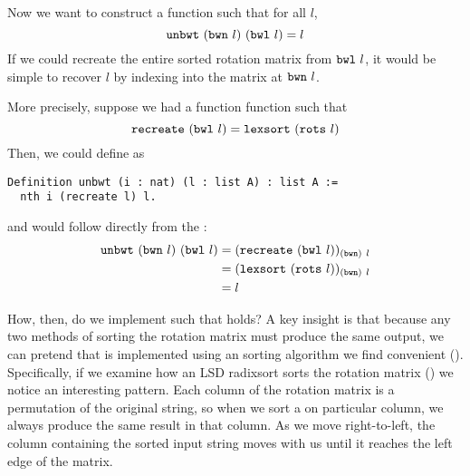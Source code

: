 \documentclass[sigplan,10pt,anonymous,review]{thesis}
\begin{document}
Now we want to construct a function  such that for all $l$,
\begin{equation}
  \texttt{\textup{unbwt}}~(\texttt{\textup{bwn}}~l)~(\texttt{\textup{bwl}}~l) = l
  \label{eq:unbwt}
\end{equation}
If we could recreate the entire sorted rotation matrix from
$\texttt{\textup{bwl}}~l$, it would be simple to recover $l$ by indexing into
the matrix at $\texttt{\textup{bwn}}~l$.

More precisely, suppose we had a function function 
such that
\begin{equation}
  \label{eq:recreate}
  \texttt{\textup{recreate}}~(\texttt{\textup{bwl}}~l) = \texttt{\textup{lexsort}}~(\texttt{\textup{rots}}~l)
\end{equation}
Then, we could define  as
\begin{lstlisting}
Definition unbwt (i : nat) (l : list A) : list A :=
  nth i (recreate l) l.
\end{lstlisting}
and  would follow directly from the :
\begin{align*}
     \texttt{\textup{unbwt}}~(\texttt{\textup{bwn}}~l)~(\texttt{\textup{bwl}}~l)
  &= (\texttt{\textup{recreate}}~(\texttt{\textup{bwl}}~l))_{(\texttt{\textup{bwn}})~l}\\
  &= (\texttt{\textup{lexsort}}~(\texttt{\textup{rots}}~l))_{(\texttt{\textup{bwn}})~l} \\
  &= l
\end{align*}

How, then, do we implement  such that 
holds? A key insight is that because any two methods of sorting the
rotation matrix must produce the same output, we can pretend that
 is implemented using an sorting algorithm we find
convenient (). Specifically, if we examine
how an LSD radixsort sorts the rotation matrix
() we notice an interesting pattern. Each
column of the rotation matrix is a permutation of the original string,
so when we sort a on particular column, we always produce the same
result in that column. As we move right-to-left, the column containing
the sorted input string moves with us until it reaches the left edge
of the matrix.
\end{document}
